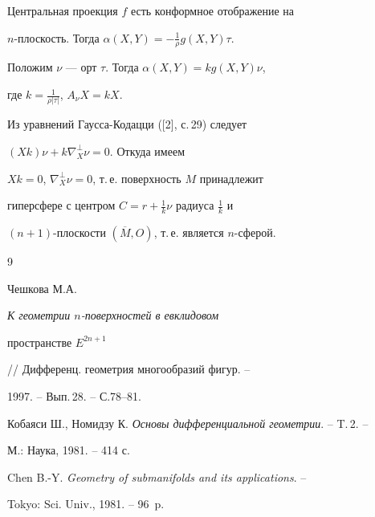 \begin{examnonum} Центральная проекция $f$ есть конформное отображение на


$n$-плоскость. Тогда $\alpha(X,Y)=-\frac{1}{\rho}g(X,Y) \tau.$


Положим $\nu$ --- орт $\tau$. Тогда $\alpha(X,Y)=kg(X,Y)\nu$, 


где $k=\frac{1}{\rho|\tau|}$, $A_{\nu}X=kX.$


Из уравнений Гаусса-Кодацци ([2], с.\,29) следует


$(Xk)\nu+k\nabla^{\bot}_{X}\nu=0$. Откуда имеем


$Xk=0$, $\nabla^{\bot}_{X}\nu=0$, т.\,е. поверхность $M$ принадлежит


гиперсфере с центром $C=r+\frac{1}{k}\nu$ радиуса $\frac{1}{k}$ и 


$(n+1)$-плоскости $(\overline{M},O)$, т.\,е. является  $n$-сферой.


\end{examnonum}





\begin{thebibliography}{9}




Чешкова М.А. {\em К геометрии $n$-поверхностей в евклидовом 


пространстве $E^{2n+1}$} // Дифференц. геометрия многообразий фигур. --


1997. -- Вып.\,28. -- С.78--81.




Кобаяси Ш., Номидзу К. {\em Основы дифференциальной геометрии}. -- T.\,2. --


М.: Наука, 1981. -- 414 с.




Chen B.-Y. {\em Geometry of submanifolds and its applications}. --


Tokyo: Sci. Univ., 1981. -- 96~p.





\end{thebibliography}





\vskip 2cm











\label{end} 


 


